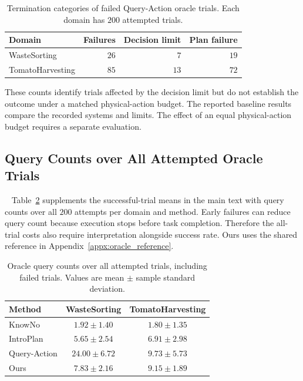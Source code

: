 \begin{table}[!htbp]
\centering
\caption{Termination categories of failed Query-Action oracle trials. Each domain has $200$ attempted trials.}
\label{tab:app_query_action_budget}
\small
\begin{tabular}{lrrr}
\toprule
Domain & Failures & Decision limit & Plan failure \\
\midrule
WasteSorting & $26$ & $7$ & $19$ \\
TomatoHarvesting & $85$ & $13$ & $72$ \\
\bottomrule
\end{tabular}
\end{table}

These counts identify trials affected by the decision limit but do not establish the outcome under a matched physical-action budget. The reported baseline results compare the recorded systems and limits. The effect of an equal physical-action budget requires a separate evaluation.

\subsection{Query Counts over All Attempted Oracle Trials}~\label{appx:all_trial_queries}
Table~\ref{tab:app_all_trial_queries} supplements the successful-trial means in the main text with query counts over all $200$ attempts per domain and method. Early failures can reduce query count because execution stops before task completion. Therefore the all-trial costs also require interpretation alongside success rate. Ours uses the shared reference in Appendix~\ref{appx:oracle_reference}.

\begin{table}[!htbp]
\centering
\caption{Oracle query counts over all attempted trials, including failed trials. Values are mean $\pm$ sample standard deviation.}
\label{tab:app_all_trial_queries}
\small
\begin{tabular}{lcc}
\toprule
Method & WasteSorting & TomatoHarvesting \\
\midrule
KnowNo & $1.92 \pm 1.40$ & $1.80 \pm 1.35$ \\
IntroPlan & $5.65 \pm 2.54$ & $6.91 \pm 2.98$ \\
Query-Action & $24.00 \pm 6.72$ & $9.73 \pm 5.73$ \\
Ours & $7.83 \pm 2.16$ & $9.15 \pm 1.89$ \\
\bottomrule
\end{tabular}
\end{table}

